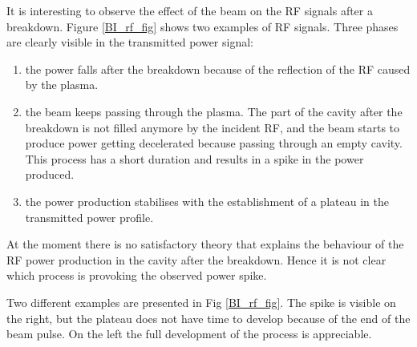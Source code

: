 It is interesting to observe the effect of the beam on the RF signals after a breakdown. Figure \ref{BI_rf_fig}  shows two examples of RF signals. Three phases are clearly visible in the transmitted power signal: 
\begin{enumerate}
\item the power falls after the breakdown because of the reflection of the RF caused by the plasma.
\item the beam keeps passing through the plasma. The part of the cavity after the breakdown is not filled anymore by the incident RF, and the beam starts to produce power getting decelerated because passing through an empty cavity. This process has a short duration and results in a spike in the power produced. 
\item the power production stabilises with the establishment of a plateau in the transmitted power profile.
\end{enumerate}
At the moment there is no satisfactory theory that explains the behaviour of the RF power production in the cavity after the breakdown. Hence it is not clear which process is provoking the observed power spike.

Two different examples are presented in Fig \ref{BI_rf_fig}. The spike is visible on the right, but the plateau does not have time to develop because of the end of the beam pulse. On the left the full development of the process is appreciable.

